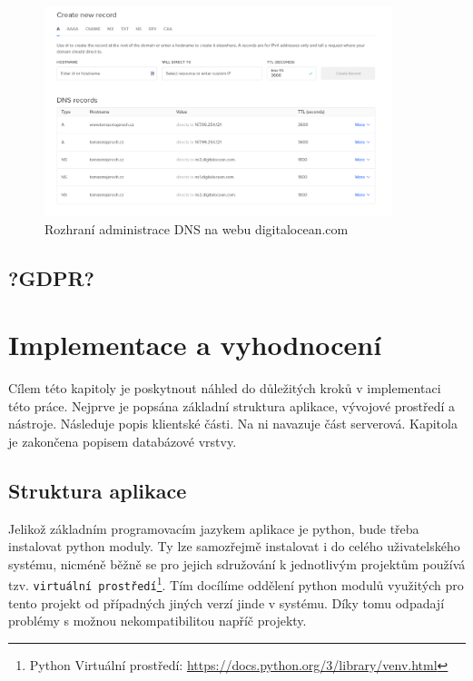 \begin{figure}
    \centering
    \includegraphics[width=0.9\textwidth]{obrazky-figures/digitaloceanDNSadmin.png}
    \caption{Rozhraní administrace DNS na webu digitalocean.com}
    \label{fig:digitalocean-dns}
\end{figure}

\section{?GDPR?}



\chapter{Implementace a vyhodnocení}
\label{chap:implementace}
Cílem této kapitoly je poskytnout náhled do důležitých kroků v implementaci této práce. Nejprve je popsána základní struktura aplikace, vývojové prostředí a nástroje. Následuje popis klientské části. Na ni navazuje část serverová. Kapitola je zakončena popisem databázové vrstvy.

\section{Struktura aplikace}
Jelikož základním programovacím jazykem aplikace je python, bude třeba instalovat python moduly. Ty lze samozřejmě instalovat i do celého uživatelského systému, nicméně běžně se pro jejich sdružování k jednotlivým projektům používá tzv. \texttt{virtuální prostředí}\footnote{Python Virtuální prostředí: \url{https://docs.python.org/3/library/venv.html}}. Tím docílíme oddělení python modulů využitých pro tento projekt od případných jiných verzí jinde v systému. Díky tomu odpadají problémy s možnou nekompatibilitou napříč projekty. 

